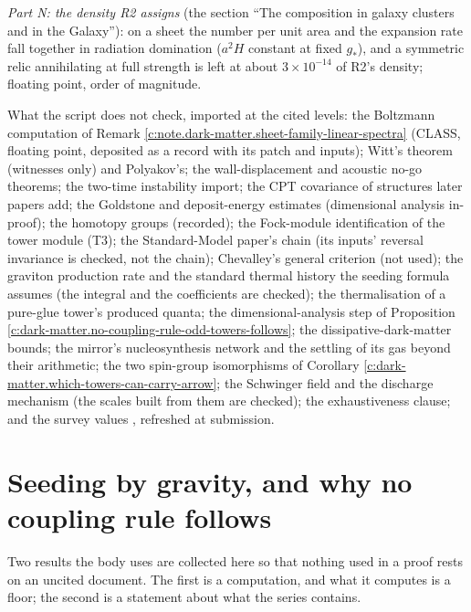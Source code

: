 \documentclass[11pt]{article}
\theoremstyle{definition}
\theoremstyle{plain}
\begin{document}
\emph{Part N: the density R2 assigns} (the section ``The composition in galaxy clusters and in the Galaxy''): on a sheet the number per unit area and the expansion rate fall together in radiation domination ($a^{2}H$ constant at fixed $g_{*}$), and a symmetric relic annihilating at full strength is left at about $3 \times 10^{-14}$ of R2's density; floating point, order of magnitude.

What the script does not check, imported at the cited levels: the Boltzmann computation of Remark \ref{c:note.dark-matter.sheet-family-linear-spectra} (CLASS, floating point, deposited as a record with its patch and inputs); Witt's theorem (witnesses only) and Polyakov's; the wall-displacement and acoustic no-go theorems; the two-time instability import; the CPT covariance of structures later papers add; the Goldstone and deposit-energy estimates (dimensional analysis in-proof); the homotopy groups (recorded); the Fock-module identification of the tower module (T3); the Standard-Model paper's chain (its inputs' reversal invariance is checked, not the chain); Chevalley's general criterion (not used); the graviton production rate and the standard thermal history the seeding formula assumes (the integral and the coefficients are checked); the thermalisation of a pure-glue tower's produced quanta; the dimensional-analysis step of Proposition \ref{c:dark-matter.no-coupling-rule-odd-towers-follows}; the dissipative-dark-matter bounds; the mirror's nucleosynthesis network and the settling of its gas beyond their arithmetic; the two spin-group isomorphisms of Corollary \ref{c:dark-matter.which-towers-can-carry-arrow}; the Schwinger field and the discharge mechanism (the scales built from them are checked); the exhaustiveness clause; and the survey values \cite{Planck2018}, refreshed at submission.

\section{Seeding by gravity, and why no coupling rule follows}

\label{c:note.dark-matter.setting-seeding-gravity-why-no-coupling}
Two results the body uses are collected here so that nothing used in a proof rests on an uncited document. The first is a computation, and what it computes is a floor; the second is a statement about what the series contains.
\end{document}

